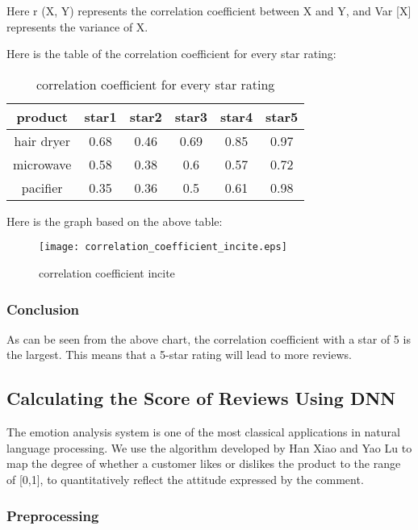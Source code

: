 \documentclass{mcmthesis}
\begin{document}
	Here r (X, Y) represents the correlation coefficient between X and Y, and Var [X] represents the variance of X.
	
	Here is the table of the correlation coefficient for every star rating:
	
	\begin{table}[H]
		\centering
		\caption{correlation coefficient for every star rating}
		\resizebox{120mm}{15mm}
		{%
			\begin{tabular}{|c|c|c|c|c|c|}
				\hline
				product    & star1 & star2 & star3 & star4 & star5 \\ \hline
				hair dryer & 0.68  & 0.46  & 0.69  & 0.85  & 0.97  \\ \hline
				microwave  & 0.58  & 0.38  & 0.6   & 0.57  & 0.72  \\ \hline
				pacifier   & 0.35  & 0.36  & 0.5   & 0.61  & 0.98  \\ \hline
			\end{tabular}%
		}
	\end{table}
	
	Here is the graph based on the above table:
	
	\begin{figure}[H]
		\small
		\centering
		\texttt{[image: correlation\_coefficient\_incite.eps]}
		\caption{correlation coefficient incite} \label{fig:correlation coefficient incite}
	\end{figure}
	
	\subsubsection{Conclusion}
	
	As can be seen from the above chart, the correlation coefficient with a star of 5 is the largest. This means that a 5-star rating will lead to more reviews.
	
	\subsection{Calculating the Score of Reviews Using DNN}
	The emotion analysis system is one of the most classical applications in natural language processing. We use the algorithm developed by Han Xiao and Yao Lu\cite{1} to map the degree of whether a customer likes or dislikes the product to the range of [0,1], to quantitatively reflect the attitude expressed by the comment.
	\subsubsection{Preprocessing}
	
\end{document}
